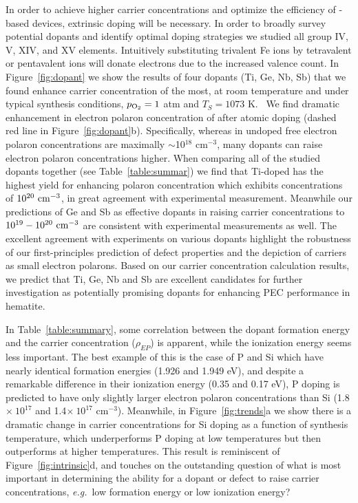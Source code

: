  In order to achieve higher carrier concentrations and optimize the efficiency of -based devices, extrinsic doping will be necessary.
 In order to broadly survey potential dopants and identify optimal doping strategies we studied all group IV, V, XIV, and XV elements. Intuitively substituting trivalent Fe ions by tetravalent or pentavalent ions will donate electrons due to the increased valence count.
 In Figure~\ref{fig:dopant} we show the results of four dopants (Ti, Ge, Nb, Sb) that we found enhance carrier concentration of  the most, at room temperature and under typical synthesis conditions, $p_{\rm O_2}=1$ atm and $T_S=1073$ K.~\cite{tian2020electronic}
 We find dramatic enhancement in electron polaron concentration of  after atomic doping (dashed red line in Figure~\ref{fig:dopant}b).
 Specifically, whereas in undoped  free electron polaron concentrations are maximally $\sim$10$^{18}$ cm$^{-3}$, many dopants can raise electron polaron concentrations higher.
 When comparing all of the studied dopants together (see Table~\ref{table:summar}) we find that Ti-doped  has the highest yield for enhancing polaron concentration which exhibits concentrations of $\rm 10^{20}\ cm^{-3}$, in great agreement with experimental measurement. \cite{hahn2010photoelectrochemical,glasscock2007enhancement,rioult2014single,fu2014highly,malviya2017influence}
 Meanwhile our predictions of Ge and Sb as effective dopants in raising carrier concentrations to $\rm 10^{19}-10^{20}\ cm^{-3}$ are consistent with experimental measurements as well.\cite{annamalai2018influence,liu2014highly}
 The excellent agreement with experiments on various dopants highlight the robustness of our first-principles prediction of defect properties and the depiction of carriers as small electron polarons.
 Based on our carrier concentration calculation results, we predict that Ti, Ge, Nb and Sb are excellent candidates for further investigation as potentially promising dopants for enhancing PEC performance in hematite.


 In Table~\ref{table:summary}, some correlation between the dopant formation energy and the carrier concentration ($\rho_{EP}$) is apparent, while the ionization energy seems less important.
 The best example of this is the case of P and Si which have nearly identical formation energies (1.926 and 1.949 eV), and despite a remarkable difference in their ionization energy (0.35 and 0.17 eV), P doping is predicted to have only slightly larger electron polaron concentrations than Si (1.8$\times\ 10^{17}$ and 1.4$\times\ 10^{17}$ cm$^{-3}$).
 Meanwhile, in Figure~\ref{fig:trends}a we show there is a dramatic change in carrier concentrations for Si doping as a function of synthesis temperature, which underperforms P doping at low temperatures but then outperforms at higher temperatures.
 This result is reminiscent of Figure~\ref{fig:intrinsic}d, and touches on the outstanding question of what is most important in determining the ability for a dopant or defect to raise carrier concentrations, \textit{e.g.}\ low formation energy or low ionization energy?

